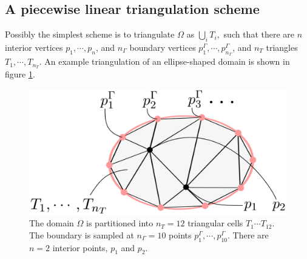 \subsection{A piecewise linear triangulation scheme}
Possibly the simplest scheme is to triangulate $\Omega$ as
    $\bigcup_i T_i,$
such that there are $n$ interior vertices $p_1,\cdots,p_n$, and $n_\Gamma$ boundary vertices $p^\Gamma_1,\cdots,p^\Gamma_{n_\Gamma}$, and $n_T$ triangles
$T_1,\cdots,T_{n_T}$. An example triangulation of an ellipse-shaped domain is shown in figure \ref{triangulation}.
\begin{figure}[H]
    \begin{center}
        \includegraphics[width=0.53\linewidth]{figures/triangulation/triangulation.png}
    \end{center}
    \caption{\scriptsize
        The domain $\Omega$ is partitioned into $n_T = 12$ triangular cells $T_1\cdots T_{12}$. The boundary is sampled at $n_\Gamma = 10$ points
        $p^\Gamma_1,\cdots,p^\Gamma_{10}$.
        There are $n = 2$ interior points, $p_1$ and $p_2$.
    }
    \label{triangulation}
\end{figure}

